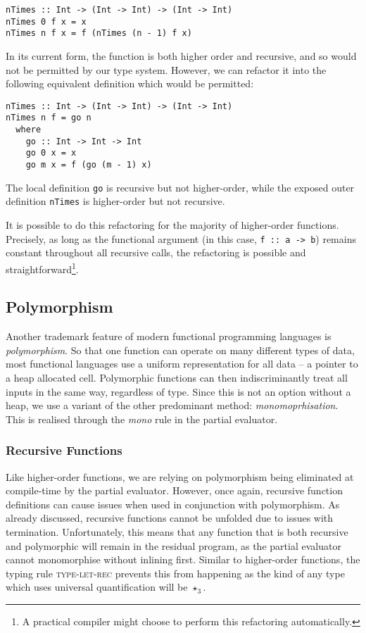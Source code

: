 \documentclass[runningheads]{llncs}
\begin{document}
\begin{verbatim}
nTimes :: Int -> (Int -> Int) -> (Int -> Int)
nTimes 0 f x = x
nTimes n f x = f (nTimes (n - 1) f x)
\end{verbatim}

In its current form, the function is both higher order and recursive, and so would not be permitted by our type system. However, we can refactor it into the following equivalent definition which would be permitted:

\begin{verbatim}
nTimes :: Int -> (Int -> Int) -> (Int -> Int)
nTimes n f = go n
  where
    go :: Int -> Int -> Int
    go 0 x = x
    go m x = f (go (m - 1) x)
\end{verbatim}

The local definition \texttt{go} is recursive but not higher-order, while the exposed outer definition \texttt{nTimes} is higher-order but not recursive.

It is possible to do this refactoring for the majority of higher-order functions. Precisely, as long as the functional argument (in this case, \texttt{f :: a -> b}) remains constant throughout all recursive calls, the refactoring is possible and straightforward\footnote{A practical compiler might choose to perform this refactoring automatically.}.

\subsection{Polymorphism} \label{sec:polymorphism}

Another trademark feature of modern functional programming languages is \emph{polymorphism}. So that one function can operate on many different types of data, most functional languages use a uniform representation for all data -- a pointer to a heap allocated cell. Polymorphic functions can then indiscriminantly treat all inputs in the same way, regardless of type. Since this is not an option without a heap, we use a variant of the other predominant method: \emph{monomoprhisation}. This is realised through the \textit{mono} rule in the partial evaluator.

\subsubsection{Recursive Functions}

Like higher-order functions, we are relying on polymorphism being eliminated at compile-time by the partial evaluator. However, once again, recursive function definitions can cause issues when used in conjunction with polymorphism. As already discussed, recursive functions cannot be unfolded due to issues with termination. Unfortunately, this means that any function that is both recursive and polymorphic will remain in the residual program, as the partial evaluator cannot monomorphise without inlining first. Similar to higher-order functions, the typing rule \textsc{type-let-rec} prevents this from happening as the kind of any type which uses universal quantification will be $\star_3$.
\end{document}
